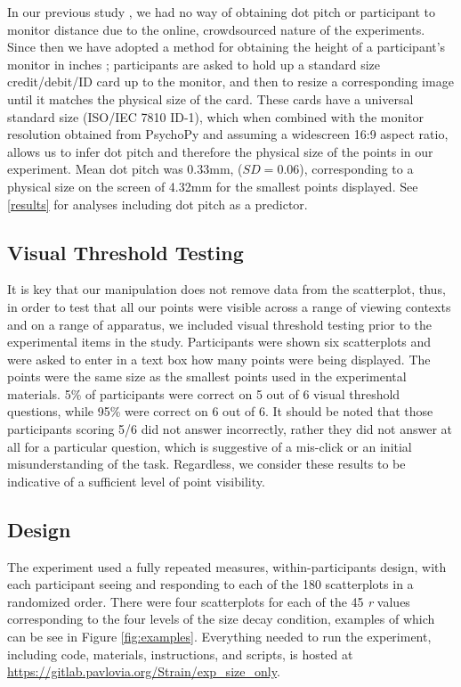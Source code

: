 \documentclass{vgtc}                          %
\begin{document}
In our previous study \cite{strain_2023}, we had no way of obtaining dot pitch
or participant to monitor distance due to the online, crowdsourced nature of the
experiments. Since then we have adopted a method for obtaining the height of a
participant's monitor in inches \cite{screenscale}; participants are asked to hold up a standard size
credit/debit/ID card up to the monitor, and then to resize a corresponding image until
it matches the physical size of the card. These cards have a universal
standard size (ISO/IEC 7810 ID-1), which when combined with
the monitor resolution obtained from PsychoPy \cite{pierce_psychopy_2019}
and assuming a widescreen 16:9 aspect ratio,
allows us to infer dot pitch and therefore the physical size of the points in our
experiment. Mean dot pitch was 0.33mm, (\(SD = 0.06\)),
corresponding to a physical size on the screen of 4.32mm
for the smallest points displayed. See \autoref{results} for analyses including dot pitch as a predictor.

\hypertarget{visual-threshold-testing}{%
\subsection{Visual Threshold Testing}\label{visual-threshold-testing}}

It is key that our manipulation does not remove data from the scatterplot,
thus, in order to test that all our points were visible across a range of viewing
contexts and on a range of apparatus, we included visual threshold testing prior
to the experimental items in the study. Participants were shown six scatterplots
and were asked to enter in a text box how many points
were being displayed. The points were the same size as the smallest points used
in the experimental materials. 5\% of
participants were correct on 5 out of 6 visual
threshold questions, while 95\% were correct
on 6 out of 6. It should be noted that those
participants scoring 5/6 did not answer incorrectly, rather they did not answer
at all for a particular question, which is suggestive of
a mis-click or an initial misunderstanding of the task. Regardless, we consider these results to be indicative of a sufficient level of
point visibility.

\hypertarget{design}{%
\subsection{Design}\label{design}}

The experiment used a fully repeated measures, within-participants design, with each
participant seeing and responding to each of the 180 scatterplots in a randomized order.
There were four scatterplots for each of the 45 \emph{r} values corresponding to the
four levels of the size decay condition, examples of which can be see in Figure \ref{fig:examples}.
Everything needed to run the experiment, including code, materials, instructions, and scripts, is
hosted at \url{https://gitlab.pavlovia.org/Strain/exp_size_only}.
\end{document}
